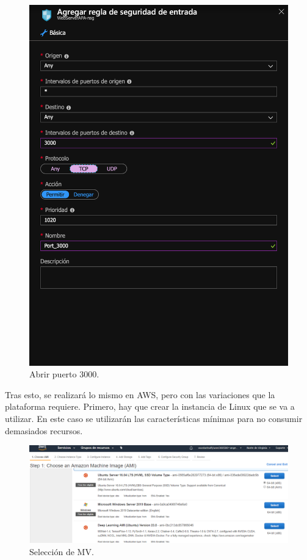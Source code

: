 \documentclass[10pt]{article}
\begin{document}
\begin{figure}[h!]
 \includegraphics[width=\linewidth]{./Web/Azure/Azure3.png}
 \caption{Abrir puerto 3000.}
\end{figure}

Tras esto, se realizará lo mismo en AWS, pero con las variaciones que la plataforma
requiere. Primero, hay que crear la instancia de Linux que se va a utilizar. En
este caso se utilizarán las características mínimas para no consumir demasiados
recursos.

\begin{figure}[h!]
 \includegraphics[width=\linewidth]{./Web/AWS/AWS1.png}
 \caption{Selección de MV.}
\end{figure}
\end{document}
